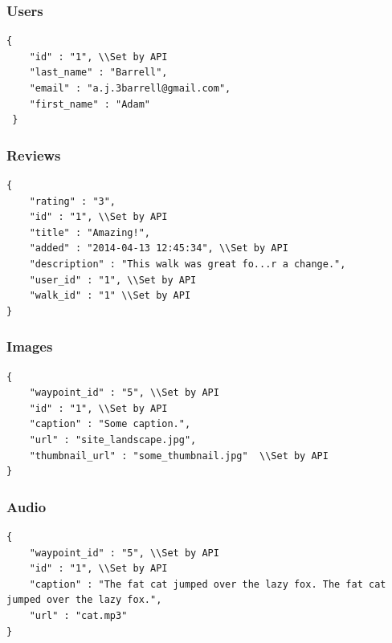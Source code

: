 \documentclass[11pt,a4paper]{report}
\begin{document}
\subsubsection{Users}

\begin{lstlisting}[captionpos=b, caption=An example JSON Waypoint Object., label=lst:walk]
{
    "id" : "1", \\Set by API
    "last_name" : "Barrell",
    "email" : "a.j.3barrell@gmail.com",
    "first_name" : "Adam"
 }
\end{lstlisting}

\subsubsection{Reviews}

\begin{lstlisting}[captionpos=b, caption=An example JSON Waypoint Object., label=lst:walk]
{
    "rating" : "3",
    "id" : "1", \\Set by API
    "title" : "Amazing!",
    "added" : "2014-04-13 12:45:34", \\Set by API
    "description" : "This walk was great fo...r a change.",
    "user_id" : "1", \\Set by API
    "walk_id" : "1" \\Set by API
}
\end{lstlisting}

\subsubsection{Images}

\begin{lstlisting}[captionpos=b, caption=An example JSON Waypoint Object., label=lst:walk]
{
    "waypoint_id" : "5", \\Set by API
    "id" : "1", \\Set by API
    "caption" : "Some caption.",
    "url" : "site_landscape.jpg",
    "thumbnail_url" : "some_thumbnail.jpg"  \\Set by API
}
\end{lstlisting}

\subsubsection{Audio}

\begin{lstlisting}[captionpos=b, caption=An example JSON Waypoint Object., label=lst:walk]
{
    "waypoint_id" : "5", \\Set by API
    "id" : "1", \\Set by API
    "caption" : "The fat cat jumped over the lazy fox. The fat cat jumped over the lazy fox.",
    "url" : "cat.mp3"
}
\end{lstlisting}
\end{document}
